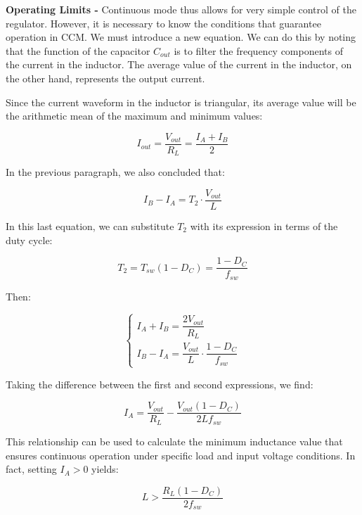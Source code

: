 \documentclass[../main.tex]{subfiles}
\begin{document}
\textbf{Operating Limits -} Continuous mode thus allows for very simple control of the regulator. However, it is necessary to know the conditions that guarantee operation in CCM. We must introduce a new equation. We can do this by noting that the function of the capacitor $C_{out}$ is to filter the frequency components of the current in the inductor. The average value of the current in the inductor, on the other hand, represents the output current.

Since the current waveform in the inductor is triangular, its average value will be the arithmetic mean of the maximum and minimum values:

\begin{equation}
	I_{out} = \frac{V_{out}}{R_L} = \frac{I_A + I_B}{2}
\end{equation}

In the previous paragraph, we also concluded that:

\begin{equation}
	I_B - I_A = T_2 \cdot \frac{V_{out}}{L}
\end{equation}

In this last equation, we can substitute $T_2$ with its expression in terms of the duty cycle:

\begin{equation}
	T_2 = T_{sw} (1 - D_C) = \frac{1 - D_C}{f_{sw}} 
\end{equation}

Then:

\begin{equation}
\begin{cases}
	I_A + I_B = \dfrac{2V_{out}}{R_L} \\
	I_B - I_A = \dfrac{V_{out}}{L} \cdot \dfrac{1 - D_C}{f_{sw}}
\end{cases}	
\end{equation}

Taking the difference between the first and second expressions, we find:

\begin{equation}
	I_A = \frac{V_{out}}{R_L} - \frac{V_{out}(1 - D_C)}{2Lf_{sw}}
\end{equation}

This relationship can be used to calculate the minimum inductance value that ensures continuous operation under specific load and input voltage conditions. In fact, setting $I_A > 0$ yields:

\begin{equation}
	L > \frac{R_L(1 - D_C)}{2f_{sw}}
\end{equation}
\end{document}
